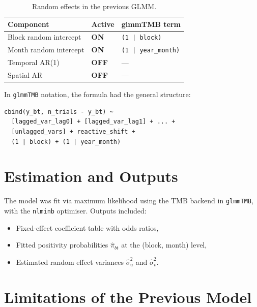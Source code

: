 \documentclass[12pt,a4paper]{article}
\begin{document}
\begin{table}[ht]
\centering
\small
\begin{tabular}{lll}
\toprule
\textbf{Component} & \textbf{Active} & \textbf{glmmTMB term} \\
\midrule
Block random intercept & \textbf{ON}  & \texttt{(1 | block)} \\
Month random intercept & \textbf{ON}  & \texttt{(1 | year\_month)} \\
Temporal AR(1)         & \textbf{OFF} & --- \\
Spatial AR             & \textbf{OFF} & --- \\
\bottomrule
\end{tabular}
\caption{Random effects in the previous GLMM.}
\end{table}

In \texttt{glmmTMB} notation, the formula had the general structure:
\begin{verbatim}
cbind(y_bt, n_trials - y_bt) ~
  [lagged_var_lag0] + [lagged_var_lag1] + ... +
  [unlagged_vars] + reactive_shift +
  (1 | block) + (1 | year_month)
\end{verbatim}

\section{Estimation and Outputs}

The model was fit via maximum likelihood using the TMB backend in \texttt{glmmTMB}, with the \texttt{nlminb} optimiser. Outputs included:
\begin{itemize}
  \item Fixed-effect coefficient table with odds ratios,
  \item Fitted positivity probabilities $\hat{\pi}_{bt}$ at the (block, month) level,
  \item Estimated random effect variances $\hat{\sigma}_u^2$ and $\hat{\sigma}_v^2$.
\end{itemize}

\section{Limitations of the Previous Model}
\end{document}
